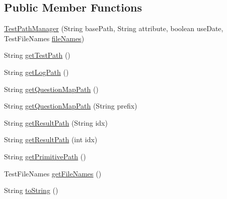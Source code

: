\subsection*{Public Member Functions}
\begin{DoxyCompactItemize}
\item 
\hyperlink{classit_1_1emarolab_1_1cagg_1_1interfaces_1_1CaggGrammarTesterOnFile_1_1TestPathManager_aa4eeaaee1de64d1da93f51e156c8f77b}{Test\-Path\-Manager} (String base\-Path, String attribute, boolean use\-Date, Test\-File\-Names \hyperlink{classit_1_1emarolab_1_1cagg_1_1interfaces_1_1CaggGrammarTesterOnFile_1_1TestPathManager_a52485b2eb5d906945b9af34959ff70f3}{file\-Names})
\item 
String \hyperlink{classit_1_1emarolab_1_1cagg_1_1interfaces_1_1CaggGrammarTesterOnFile_1_1TestPathManager_a90d81cc57a665d364049405ed42b6b2a}{get\-Test\-Path} ()
\item 
String \hyperlink{classit_1_1emarolab_1_1cagg_1_1interfaces_1_1CaggGrammarTesterOnFile_1_1TestPathManager_ac418e7561755c7ff55f9ec18cc9f2d6c}{get\-Log\-Path} ()
\item 
String \hyperlink{classit_1_1emarolab_1_1cagg_1_1interfaces_1_1CaggGrammarTesterOnFile_1_1TestPathManager_a205f312c92564f0d1f4c58e250552671}{get\-Question\-Map\-Path} ()
\item 
String \hyperlink{classit_1_1emarolab_1_1cagg_1_1interfaces_1_1CaggGrammarTesterOnFile_1_1TestPathManager_ac55f74fcd1113f181f34ba15bd146172}{get\-Question\-Map\-Path} (String prefix)
\item 
String \hyperlink{classit_1_1emarolab_1_1cagg_1_1interfaces_1_1CaggGrammarTesterOnFile_1_1TestPathManager_ad8b32de92691520693de0aa01a16aea1}{get\-Result\-Path} (String idx)
\item 
String \hyperlink{classit_1_1emarolab_1_1cagg_1_1interfaces_1_1CaggGrammarTesterOnFile_1_1TestPathManager_a23447b4882d63d8ae686713f075e6631}{get\-Result\-Path} (int idx)
\item 
String \hyperlink{classit_1_1emarolab_1_1cagg_1_1interfaces_1_1CaggGrammarTesterOnFile_1_1TestPathManager_a4d20665af31b03391263012a294307c8}{get\-Primitive\-Path} ()
\item 
Test\-File\-Names \hyperlink{classit_1_1emarolab_1_1cagg_1_1interfaces_1_1CaggGrammarTesterOnFile_1_1TestPathManager_ad5205f44036a22ec3406b435c8226504}{get\-File\-Names} ()
\item 
String \hyperlink{classit_1_1emarolab_1_1cagg_1_1interfaces_1_1CaggGrammarTesterOnFile_1_1TestPathManager_ae3a8ce7e6128ac6d2f0de59dc1886fcc}{to\-String} ()
\end{DoxyCompactItemize}
